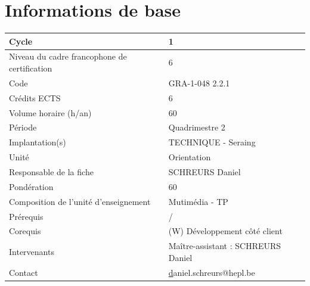 


\tableofcontents
{}


\clearpage
{}
\section{Informations de base}

\begin{table}[H]
    \begin{tabular}{|l|l|}
        \hline
        Cycle                                        & 1                                  \\ \hline
        Niveau du cadre francophone de certification & 6                                  \\ \hline
        Code                                         & GRA-1-048 2.2.1                    \\ \hline
        Crédits ECTS                                 & 6                                  \\ \hline
        Volume horaire (h/an)                        & 60                                 \\ \hline
        Période                                      & Quadrimestre 2                     \\ \hline
        Implantation(s)                              & TECHNIQUE - Seraing                \\ \hline
        Unité                                        & Orientation                        \\ \hline
        Responsable de la fiche                      & SCHREURS Daniel                    \\ \hline
        Pondération                                  & 60                                 \\ \hline
        Composition de l'unité d'enseignement        & Mutimédia - TP                     \\ \hline
        Prérequis                                    & /                                  \\ \hline
        Corequis                                     & (W) Développement côté client      \\ \hline
        Intervenants                                 & Maître-assistant : SCHREURS Daniel \\ \hline
        Contact                                      & {\ul daniel.schreurs@hepl.be}      \\ \hline
    \end{tabular}
\end{table}

